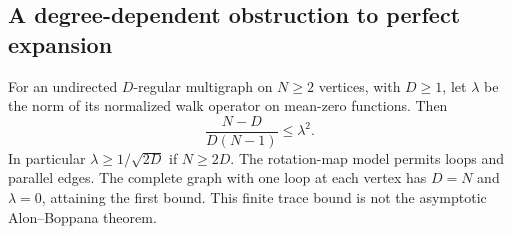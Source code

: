 \begin{result}
\subsection{A degree-dependent obstruction to perfect expansion}
For an undirected $D$-regular multigraph on $N\ge2$ vertices, with $D\ge1$,
let $\lambda$ be the norm of its normalized walk operator on mean-zero functions.
Then
\[
\frac{N-D}{D(N-1)}\le\lambda^2.
\]
In particular $\lambda\ge1/\sqrt{2D}$ if $N\ge2D$.
The rotation-map model permits loops and parallel edges. The complete graph
with one loop at each vertex has $D=N$ and $\lambda=0$, attaining the first
bound. This finite trace bound is not the asymptotic Alon--Boppana theorem.
\citep{HooryLinialWigderson2006}
\end{result}
